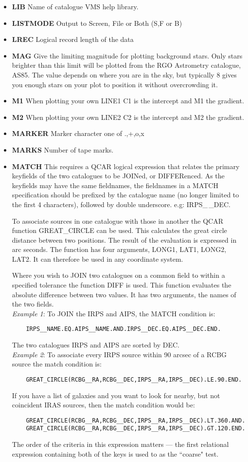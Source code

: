 \begin{itemize}
\item {\bf LIB} Name of catalogue VMS help library.
\item{\bf LISTMODE} Output to Screen, File or Both (S,F or B)
\item{\bf LREC} Logical record length of the data
\item{\bf MAG} Give the limiting magnitude for plotting background stars.
Only stars brighter than this limit will be plotted from the RGO Astrometry
catalogue, AS85.
The value depends on where you are in the sky, but typically 8 gives you
enough stars on your plot to position it without overcrowding it.
\item{\bf M1} When plotting your own LINE1 C1
is the intercept and M1 the gradient.
\item{\bf M2} When plotting your own LINE2 C2
is the intercept and M2 the gradient.
\item {\bf MARKER} Marker character one of .,+,o,x
\item{\bf MARKS} Number of tape marks.
\item{\bf MATCH}
This requires a QCAR logical expression that relates the primary keyfields
of the two catalogues to be JOINed, or DIFFERenced.
As the keyfields may have the same fieldnames, the fieldnames in a MATCH
specification should be prefixed by the catalogue name (no longer limited to
the first 4 characters), followed by double underscore.  e.g:  IRPS\_\,\_DEC.

To associate sources in one catalogue with those in another the QCAR function
GREAT\_CIRCLE can be used.
This calculates the great circle distance between two positions.
The result of the evaluation is expressed in arc seconds.
The function has four arguments, LONG1, LAT1, LONG2, LAT2.
It can therefore be used in any coordinate system.

Where you wish to JOIN two catalogues on a common field to within a specified
tolerance the function DIFF is used.
This function evaluates the absolute difference between two values.
It has two arguments, the names of the two fields.\\
{\em Example 1}: To JOIN the IRPS and AIPS, the MATCH condition is:
\begin{verbatim}
    IRPS__NAME.EQ.AIPS__NAME.AND.IRPS__DEC.EQ.AIPS__DEC.END.
\end{verbatim}
  The two catalogues IRPS and  AIPS  are  sorted  by  DEC.\\
{\em Example 2}: To associate every IRPS source within 90 arcsec of a RCBG
source the match condition is:
\begin{verbatim}
    GREAT_CIRCLE(RCBG__RA,RCBG__DEC,IRPS__RA,IRPS__DEC).LE.90.END.
\end{verbatim}
If you have a list of galaxies and you want to look for nearby, but
not coincident IRAS sources, then the match condition would be:
\begin{verbatim}
    GREAT_CIRCLE(RCBG__RA,RCBG__DEC,IRPS__RA,IRPS__DEC).LT.360.AND.
    GREAT_CIRCLE(RCBG__RA,RCBG__DEC,IRPS__RA,IRPS__DEC).GT.120.END.
\end{verbatim}
The order of the criteria in this expression matters --- the first
relational expression containing both of the keys is used to as the
``coarse" test.


\end{itemize}
